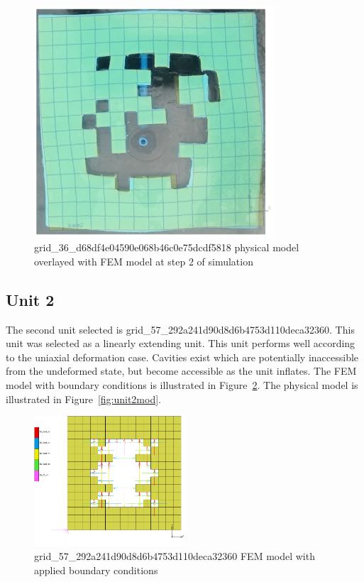 \begin{figure}[H]
	\centering
	\includegraphics[width=0.8\textwidth]{unit1defover.png}
	\caption[Physical model of unit 1 overlayed with FEM model]{grid\_36\_d68df4e04590e068b46c0e75dcdf5818 physical model overlayed with FEM model at step 2 of simulation}
	\label{fig:unit1over}
\end{figure}

\subsection{Unit 2}

The second unit selected is grid\_57\_292a241d90d8d6b4753d110deca32360. This unit was selected as a linearly extending unit. This unit performs well according to the uniaxial deformation case. Cavities exist which are potentially inaccessible from the undeformed state, but become accessible as the unit inflates. The FEM model with boundary conditions is illustrated in Figure~\ref{fig:unit2bc}. The physical model is illustrated in Figure~\ref{fig:unit2mod}.

\begin{figure}[H]
	\centering
	\includegraphics[width=0.5\textwidth]{unit2bc.png}
	\caption[FEM validation model of unit 2]{grid\_57\_292a241d90d8d6b4753d110deca32360 FEM model with applied boundary conditions}
	\label{fig:unit2bc}
\end{figure}

